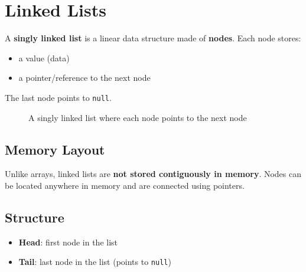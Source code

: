 \section{Linked Lists}

A \textbf{singly linked list} is a linear data structure made of \textbf{nodes}.  
Each node stores:
\begin{itemize}
  \item a value (data)
  \item a pointer/reference to the next node
\end{itemize}

The last node points to \texttt{null}.

\begin{figure}[h]
\centering
{}
\caption{A singly linked list where each node points to the next node}
\end{figure}



\subsection{Memory Layout}
Unlike arrays, linked lists are \textbf{not stored contiguously in memory}.  
Nodes can be located anywhere in memory and are connected using pointers.

\subsection{Structure}
\begin{itemize}
  \item \textbf{Head}: first node in the list
  \item \textbf{Tail}: last node in the list (points to \texttt{null})
\end{itemize}


